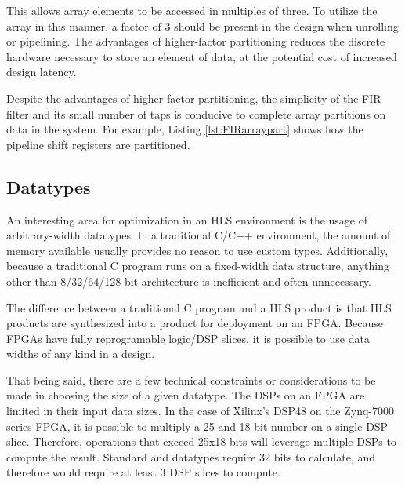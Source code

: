 \documentclass[../report_polarFIR.tex]{subfiles}
\begin{document}
This allows array elements to be accessed in multiples of three. To utilize the array in this manner, a factor of 3 should be present in the design when unrolling or pipelining. The advantages of higher-factor partitioning reduces the discrete hardware necessary to store an element of data, at the potential cost of increased design latency.

Despite the advantages of higher-factor partitioning, the simplicity of the FIR filter and its small number of taps is conducive to complete array partitions on data in the system. For example, Listing \ref{lst:FIRarraypart} shows how the pipeline shift registers are partitioned.


\begin{quote}
\begin{singlespace}
    
\end{singlespace}
\end{quote}

\subsection{Datatypes}\label{FIRdata}

An interesting area for optimization in an HLS environment is the usage of arbitrary-width datatypes. In a traditional C/C++ environment, the amount of memory available usually provides no reason to use custom types. Additionally, because a traditional C program runs on a fixed-width data structure, anything other than 8/32/64/128-bit architecture is inefficient and often unnecessary.

The difference between a traditional C program and a HLS product is that HLS products are synthesized into a product for deployment on an FPGA. Because FPGAs have fully reprogramable logic/DSP slices, it is possible to use data widths of any kind in a design.

That being said, there are a few technical constraints or considerations to be made in choosing the size of a given datatype. The DSPs on an FPGA are limited in their input data sizes. In the case of Xilinx's DSP48 on the Zynq-7000 series FPGA, it is possible to multiply a 25 and 18 bit number on a single DSP slice. Therefore, operations that exceed 25x18 bits will leverage multiple DSPs to compute the result. Standard  and  datatypes require 32 bits to calculate, and therefore would require at least 3 DSP slices to compute.
\end{document}
